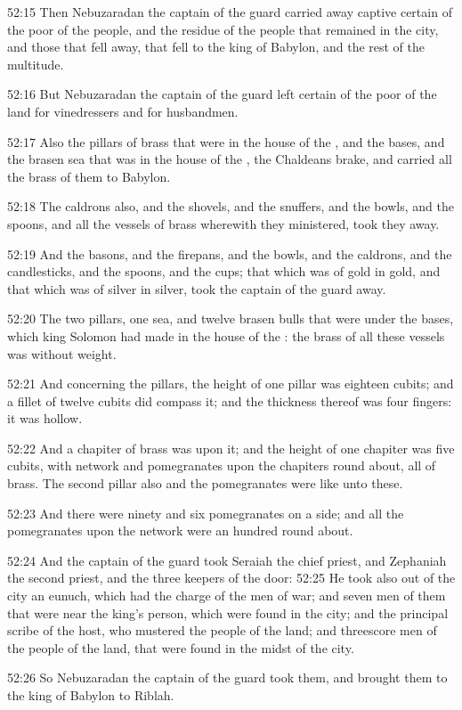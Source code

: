 52:15 Then Nebuzaradan the captain of the guard carried away captive
certain of the poor of the people, and the residue of the people that
remained in the city, and those that fell away, that fell to the king
of Babylon, and the rest of the multitude.

52:16 But Nebuzaradan the captain of the guard left certain of the
poor of the land for vinedressers and for husbandmen.

52:17 Also the pillars of brass that were in the house of the \LORD,
and the bases, and the brasen sea that was in the house of the \LORD,
the Chaldeans brake, and carried all the brass of them to Babylon.

52:18 The caldrons also, and the shovels, and the snuffers, and the
bowls, and the spoons, and all the vessels of brass wherewith they
ministered, took they away.

52:19 And the basons, and the firepans, and the bowls, and the
caldrons, and the candlesticks, and the spoons, and the cups; that
which was of gold in gold, and that which was of silver in silver,
took the captain of the guard away.

52:20 The two pillars, one sea, and twelve brasen bulls that were
under the bases, which king Solomon had made in the house of the \LORD:
the brass of all these vessels was without weight.

52:21 And concerning the pillars, the height of one pillar was
eighteen cubits; and a fillet of twelve cubits did compass it; and the
thickness thereof was four fingers: it was hollow.

52:22 And a chapiter of brass was upon it; and the height of one
chapiter was five cubits, with network and pomegranates upon the
chapiters round about, all of brass. The second pillar also and the
pomegranates were like unto these.

52:23 And there were ninety and six pomegranates on a side; and all
the pomegranates upon the network were an hundred round about.

52:24 And the captain of the guard took Seraiah the chief priest, and
Zephaniah the second priest, and the three keepers of the door: 52:25
He took also out of the city an eunuch, which had the charge of the
men of war; and seven men of them that were near the king's person,
which were found in the city; and the principal scribe of the host,
who mustered the people of the land; and threescore men of the people
of the land, that were found in the midst of the city.

52:26 So Nebuzaradan the captain of the guard took them, and brought
them to the king of Babylon to Riblah.

